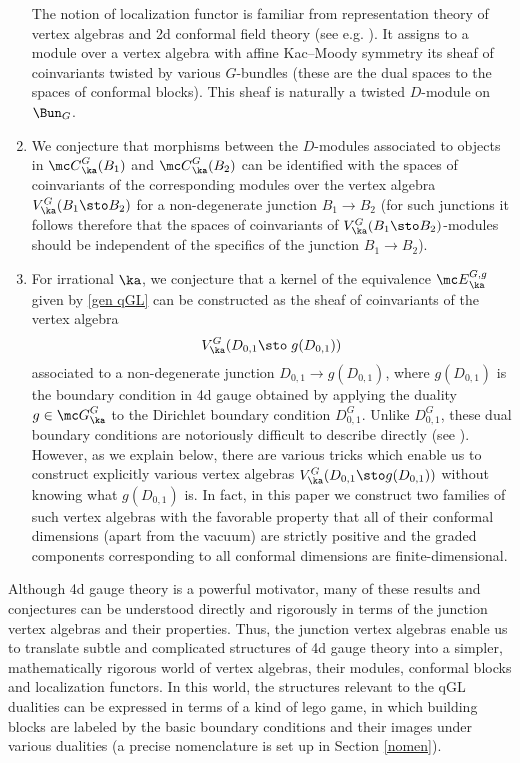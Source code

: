 \documentclass[11pt,reqno]{amsart}
\theoremstyle{plain}
\numberwithin{equation}{section}
\theoremstyle{definition}
\begin{document}
\begin{enumerate}
The notion of localization functor is familiar from representation
theory of vertex algebras and 2d conformal field theory (see
e.g. \cite{F:review}). It assigns to a module over a vertex algebra
with affine Kac--Moody symmetry its sheaf of coinvariants twisted by
various $G$-bundles (these are the dual spaces to the spaces of
conformal blocks). This sheaf is naturally a twisted $D$-module on
$\Bun_G$.

\bigskip

\item We conjecture that morphisms between the $D$-modules associated
  to objects in ${\mc C}^G_\ka(B_1)$ and ${\mc C}^G_\ka(B_2)$ can be
  identified with the spaces of coinvariants of the corresponding
  modules over the vertex algebra $V^G_\ka(B_1 \sto B_2)$ for a
  non-degenerate junction $B_1 \to B_2$ (for such junctions it follows
  therefore that the spaces of coinvariants of $V^G_\ka(B_1 \sto
  B_2)$-modules should be independent of the specifics of the junction
  $B_1 \to B_2$).

\bigskip

\item For irrational $\ka$, we conjecture that a kernel of the
  equivalence ${\mc E}^{G,g}_\ka$ given by \eqref{gen qGL} can be
  constructed as the sheaf of coinvariants of the vertex algebra
$$
V^G_\ka(D_{0,1} \sto \; g(D_{0,1}))
$$
associated to a non-degenerate junction $D_{0,1} \to g(D_{0,1})$,
where $g(D_{0,1})$ is the boundary condition in 4d gauge obtained by
applying the duality $g \in {\mc G}^G_\ka$ to the Dirichlet boundary
condition $D^G_{0,1}$. Unlike $D^G_{0,1}$, these dual boundary
conditions are notoriously difficult to describe directly (see
\cite{GW1,GW2}). However, as we explain below, there are various
tricks which enable us to construct explicitly various vertex algebras
$V^G_\ka(D_{0,1} \sto g(D_{0,1}))$ without knowing what $g(D_{0,1})$
is. In fact, in this paper we construct two families of such vertex
algebras with the favorable property that all of their conformal
dimensions (apart from the vacuum) are strictly positive and the
graded components corresponding to all conformal dimensions are
finite-dimensional.

\end{enumerate}

\bigskip

Although 4d gauge theory is a powerful motivator, many of these
results and conjectures can be understood directly and rigorously in
terms of the junction vertex algebras and their properties. Thus, the
junction vertex algebras enable us to translate subtle and complicated
structures of 4d gauge theory into a simpler, mathematically
rigorous world of vertex algebras, their modules, conformal blocks and
localization functors. In this world, the structures relevant to the
qGL dualities can be expressed in terms of a kind of lego game, in
which building blocks are labeled by the basic boundary conditions and
their images under various dualities (a precise nomenclature is set up
in Section \ref{nomen}).
\end{document}
